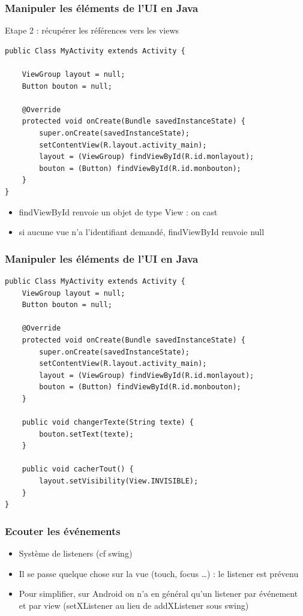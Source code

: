 \documentclass{beamer}
\begin{document}
\begin{frame}[fragile]
\frametitle{Manipuler les éléments de l'UI en Java}
Etape 2 : récupérer les références vers les views
\begin{lstlisting}
public Class MyActivity extends Activity {

    ViewGroup layout = null;
    Button bouton = null;

    @Override
    protected void onCreate(Bundle savedInstanceState) {
        super.onCreate(savedInstanceState);
        setContentView(R.layout.activity_main);
        layout = (ViewGroup) findViewById(R.id.monlayout);
        bouton = (Button) findViewById(R.id.monbouton);
    }
}
\end{lstlisting}
\begin{itemize}
    \item findViewById renvoie un objet de type View : on cast
    \item si aucune vue n'a l'identifiant demandé, findViewById renvoie null
 \end{itemize}
\end{frame}
\begin{frame}[fragile]
\frametitle{Manipuler les éléments de l'UI en Java}
\begin{lstlisting}
public Class MyActivity extends Activity {
    ViewGroup layout = null;
    Button bouton = null;

    @Override
    protected void onCreate(Bundle savedInstanceState) {
        super.onCreate(savedInstanceState);
        setContentView(R.layout.activity_main);
        layout = (ViewGroup) findViewById(R.id.monlayout);
        bouton = (Button) findViewById(R.id.monbouton);
    }
	
    public void changerTexte(String texte) {
        bouton.setText(texte);
    }
	
    public void cacherTout() {
        layout.setVisibility(View.INVISIBLE);
    }
}
\end{lstlisting}
\end{frame}
\begin{frame}[fragile]
\frametitle{Ecouter les événements}
\begin{itemize}
 \item Système de listeners (cf swing)
 \item Il se passe quelque chose sur la vue (touch, focus \ldots) : le listener
 est prévenu
 \item Pour simplifier, sur Android on n'a en général qu'un listener par
 événement et par view (setXListener au lieu de addXListener sous swing)
 \end{itemize}
\end{frame}
\end{document}
